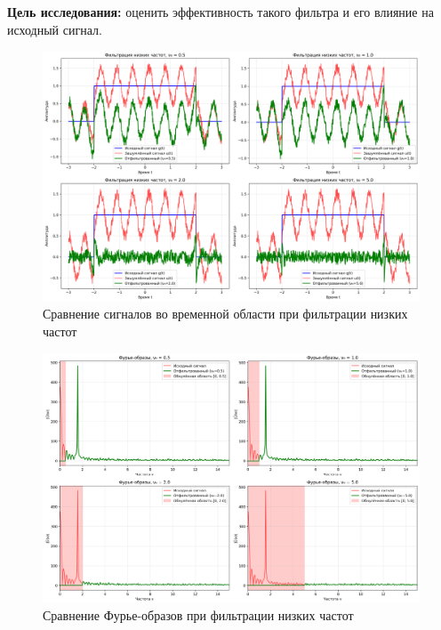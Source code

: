 \textbf{Цель исследования:} оценить эффективность такого фильтра и его влияние на исходный сигнал.

\begin{figure}[H]
\centering
\includegraphics[width=\textwidth]{images/task1/low_freq_filter_time_domain.png}
\caption{Сравнение сигналов во временной области при фильтрации низких частот}
\end{figure}

\begin{figure}[H]
\centering
\includegraphics[width=\textwidth]{images/task1/low_freq_filter_freq_domain.png}
\caption{Сравнение Фурье-образов при фильтрации низких частот}
\end{figure}

